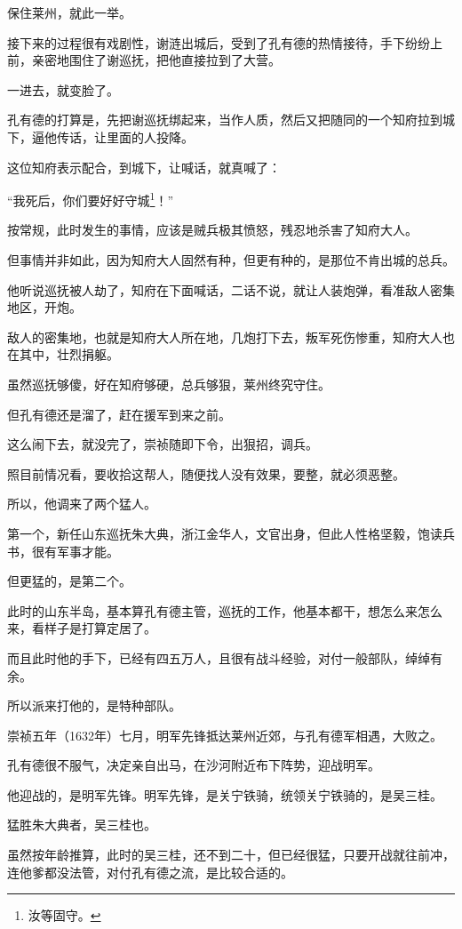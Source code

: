 \begin{multicols}{\theparacolNo}
		保住莱州，就此一举。

		接下来的过程很有戏剧性，谢涟出城后，受到了孔有德的热情接待，手下纷纷上前，亲密地围住了谢巡抚，把他直接拉到了大营。

		一进去，就变脸了。

		孔有德的打算是，先把谢巡抚绑起来，当作人质，然后又把随同的一个知府拉到城下，逼他传话，让里面的人投降。

		这位知府表示配合，到城下，让喊话，就真喊了：

		“我死后，你们要好好守城\footnote{汝等固守。}！”

		按常规，此时发生的事情，应该是贼兵极其愤怒，残忍地杀害了知府大人。

		但事情并非如此，因为知府大人固然有种，但更有种的，是那位不肯出城的总兵。

		他听说巡抚被人劫了，知府在下面喊话，二话不说，就让人装炮弹，看准敌人密集地区，开炮。

		敌人的密集地，也就是知府大人所在地，几炮打下去，叛军死伤惨重，知府大人也在其中，壮烈捐躯。

		虽然巡抚够傻，好在知府够硬，总兵够狠，莱州终究守住。

		但孔有德还是溜了，赶在援军到来之前。

		这么闹下去，就没完了，崇祯随即下令，出狠招，调兵。

		照目前情况看，要收拾这帮人，随便找人没有效果，要整，就必须恶整。

		所以，他调来了两个猛人。

		第一个，新任山东巡抚朱大典，浙江金华人，文官出身，但此人性格坚毅，饱读兵书，很有军事才能。

		但更猛的，是第二个。

		此时的山东半岛，基本算孔有德主管，巡抚的工作，他基本都干，想怎么来怎么来，看样子是打算定居了。

		而且此时他的手下，已经有四五万人，且很有战斗经验，对付一般部队，绰绰有余。

		所以派来打他的，是特种部队。

		崇祯五年（1632年）七月，明军先锋抵达莱州近郊，与孔有德军相遇，大败之。

		孔有德很不服气，决定亲自出马，在沙河附近布下阵势，迎战明军。

		他迎战的，是明军先锋。明军先锋，是关宁铁骑，统领关宁铁骑的，是吴三桂。

		猛胜朱大典者，吴三桂也。

		虽然按年龄推算，此时的吴三桂，还不到二十，但已经很猛，只要开战就往前冲，连他爹都没法管，对付孔有德之流，是比较合适的。


\end{multicols}
